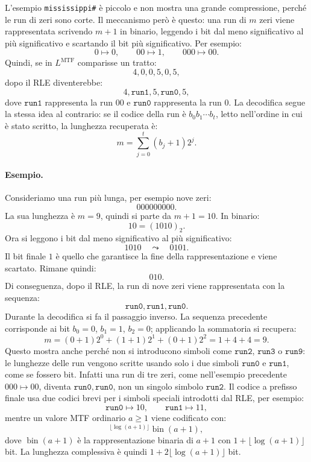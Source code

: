 \documentclass{article}
\theoremstyle{definition}
\numberwithin{equation}{section}
\begin{document}
L'esempio \texttt{mississippi\#} è piccolo e non mostra una grande compressione, perché le run di zeri sono corte. Il meccanismo però è questo: una run di $m$ zeri viene rappresentata scrivendo $m+1$ in binario, leggendo i bit dal meno significativo al più significativo e scartando il bit più significativo. Per esempio:
\[
    0\mapsto 0,
    \qquad
    00\mapsto 1,
    \qquad
    000\mapsto 00.
\]
Quindi, se in $L^{\operatorname{MTF}}$ comparisse un tratto:
\[
    4,0,0,5,0,5,
\]
dopo il RLE diventerebbe:
\[
    4,\mathtt{run1},5,\mathtt{run0},5,
\]
dove $\mathtt{run1}$ rappresenta la run $00$ e $\mathtt{run0}$ rappresenta la run $0$. La decodifica segue la stessa idea al contrario: se il codice della run è $b_0b_1\cdots b_t$, letto nell'ordine in cui è stato scritto, la lunghezza recuperata è:
\[
    m=\sum_{j=0}^{t}(b_j+1)2^j.
\]
\paragraph{Esempio.}
Consideriamo una run più lunga, per esempio nove zeri:
\[
    000000000.
\]
La sua lunghezza è $m=9$, quindi si parte da $m+1=10$. In binario:
\[
    10=(1010)_2.
\]
Ora si leggono i bit dal meno significativo al più significativo:
\[
    1010
    \quad\leadsto\quad
    0101.
\]
Il bit finale $1$ è quello che garantisce la fine della rappresentazione e viene scartato. Rimane quindi:
\[
    010.
\]
Di conseguenza, dopo il RLE, la run di nove zeri viene rappresentata con la sequenza:
\[
    \mathtt{run0},\mathtt{run1},\mathtt{run0}.
\]
Durante la decodifica si fa il passaggio inverso. La sequenza precedente corrisponde ai bit $b_0=0$, $b_1=1$, $b_2=0$; applicando la sommatoria si recupera:
\[
    m
    =
    (0+1)2^0+(1+1)2^1+(0+1)2^2
    =
    1+4+4
    =
    9.
\]
Questo mostra anche perché non si introducono simboli come $\mathtt{run2}$, $\mathtt{run3}$ o $\mathtt{run9}$: le lunghezze delle run vengono scritte usando solo i due simboli $\mathtt{run0}$ e $\mathtt{run1}$, come se fossero bit. Infatti una run di tre zeri, come nell'esempio precedente $000\mapsto 00$, diventa $\mathtt{run0},\mathtt{run0}$, non un singolo simbolo $\mathtt{run2}$.
Il codice a prefisso finale usa due codici brevi per i simboli speciali introdotti dal RLE, per esempio:
\[
    \mathtt{run0}\mapsto 10,
    \qquad
    \mathtt{run1}\mapsto 11,
\]
mentre un valore MTF ordinario $a\geq 1$ viene codificato con:
\[
    ^{\lfloor\log(a+1)\rfloor}\operatorname{bin}(a+1),
\]
dove $\operatorname{bin}(a+1)$ è la rappresentazione binaria di $a+1$ con $1+\lfloor\log(a+1)\rfloor$ bit. La lunghezza complessiva è quindi $1+2\lfloor\log(a+1)\rfloor$ bit.
\end{document}
